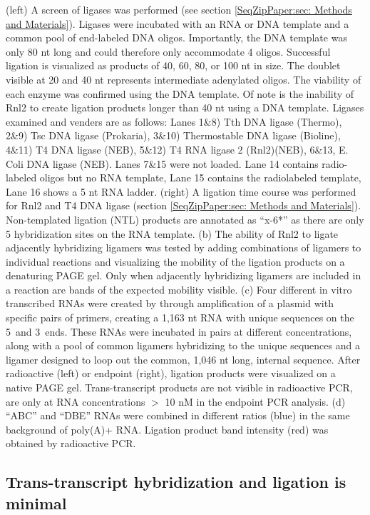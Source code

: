 			(left) A screen of ligases was performed (see section \ref{SeqZipPaper:sec: Methods and Materials}). Ligases were incubated with an RNA or DNA template and a common pool of end-labeled DNA oligos. Importantly, the DNA template was only 80 nt long and could therefore only accommodate 4 oligos. Successful ligation is visualized as products of 40, 60, 80, or 100 nt in size. The doublet visible at 20 and 40 nt represents intermediate adenylated oligos. The viability of each enzyme was confirmed using the DNA template. Of note is the inability of Rnl2 to create ligation products longer than 40 nt using a DNA template. Ligases examined and venders are as follows: Lanes 1\&8) Tth DNA ligase (Thermo), 2\&9) Tsc DNA ligase (Prokaria), 3\&10) Thermostable DNA ligase (Bioline), 4\&11) T4 DNA ligase (NEB), 5\&12) T4 RNA ligase 2 (Rnl2)(NEB), 6\&13, E. Coli DNA ligase (NEB). Lanes 7\&15 were not loaded. Lane 14 contains radio-labeled oligos but no RNA template, Lane 15 contains the radiolabeled template, Lane 16 shows a 5 nt RNA ladder.
			(right) A ligation time course was performed for Rnl2 and T4 DNA ligase (section \ref{SeqZipPaper:sec: Methods and Materials}). Non-templated ligation (NTL) products are annotated as ``x-6*'' as there are only 5 hybridization sites on the RNA template.
			(b) The ability of Rnl2 to ligate adjacently hybridizing ligamers was tested by adding combinations of ligamers to individual reactions and visualizing the mobility of the ligation products on a denaturing PAGE gel. Only when adjacently hybridizing ligamers are included in a reaction are bands of the expected mobility visible. 
			(c) Four different in vitro transcribed RNAs were created by through amplification of a plasmid with specific pairs of primers, creating a 1,163 nt RNA with unique sequences on the 5\textprime~and 3\textprime~ends. These RNAs were incubated in pairs at different concentrations, along with a pool of common ligamers hybridizing to the unique sequences and a ligamer designed to loop out the common, 1,046 nt long, internal sequence. After radioactive (left) or endpoint (right), ligation products were visualized on a native PAGE gel. Trans-transcript products are not visible in radioactive PCR, are only at RNA concentrations $>$ 10 nM in the endpoint PCR analysis.
			(d) ``ABC'' and ``DBE'' RNAs were combined in different ratios (blue) in the same background of poly(A)+ RNA. Ligation product band intensity (red) was obtained by radioactive PCR.

	\subsection{Trans-transcript hybridization and ligation is minimal}
		\label{SeqZipPaper:subsec: Trans-transcript hyb and ligation}


